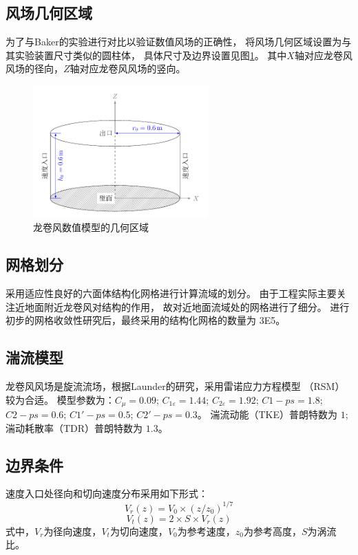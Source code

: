 \subsection{风场几何区域}
为了与Baker\cite{baker1981boundary}的实验进行对比以验证数值风场的正确性，
将风场几何区域设置为与其实验装置尺寸类似的圆柱体，
具体尺寸及边界设置见图\ref{fig:tornado-domain}。
其中$X$轴对应龙卷风风场的径向，$Z$轴对应龙卷风风场的竖向。
\begin{figure}[!htbp]
  \centering
  \includegraphics[width=0.6\textwidth]{tornado-simulation/fig/domain.pdf}
  \caption{龙卷风数值模型的几何区域}\label{fig:tornado-domain}
\end{figure}


\subsection{网格划分}
采用适应性良好的六面体结构化网格进行计算流域的划分。
由于工程实际主要关注近地面附近龙卷风对结构的作用，
故对近地面流域处的网格进行了细分。
进行初步的网格收敛性研究后，最终采用的结构化网格的数量为 \SI{3E5}{}。


\subsection{湍流模型}
龙卷风风场是旋流流场，根据Launder\cite{launder1989second}的研究，采用雷诺应力方程模型 （RSM）较为合适。
模型参数为：$C_{\mu}=0.09$; $C_{1\varepsilon}=1.44$; $C_{2\varepsilon}=1.92$; 
$C1-ps=1.8$; $C2-ps=0.6$; $C1'-ps=0.5$; $C2'-ps=0.3$。
湍流动能（TKE）普朗特数为 $1$; 湍动耗散率（TDR）普朗特数为 $1.3$。


\subsection{边界条件}
速度入口处径向和切向速度分布采用如下形式：
\begin{equation}\label{eqn:Vr}
  V_r(z) = V_0 \times (z/z_0)^{1/7}
\end{equation}
\begin{equation}\label{eqn:Vt}
  V_t(z) = 2 \times S \times V_r(z)
\end{equation}
式中，$V_r$为径向速度，$V_t$为切向速度，$V_0$为参考速度，$z_0$为参考高度，$S$为涡流比。

